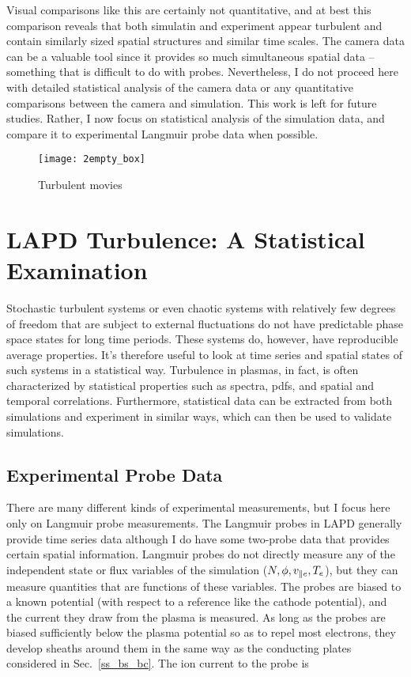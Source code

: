 Visual comparisons like this are certainly not quantitative, and at best this comparison
reveals that both simulatin and experiment appear turbulent and contain similarly sized spatial structures and similar time scales. The camera data can be a valuable tool since it provides
so much simultaneous spatial data -- something that is difficult to do with probes. Nevertheless, I do not proceed here with detailed statistical analysis of the camera data or any
quantitative comparisons between the camera and simulation. This work is left for future studies. Rather, I now focus on statistical analysis of the simulation data, and compare it to
experimental Langmuir probe data when possible.


\begin{figure}[!ht]
\centerline{\texttt{[image: 2empty\_box]}}
\caption{Turbulent movies}
\label{sim_v_exp_anim}
\end{figure}


\section{LAPD Turbulence: A Statistical Examination}
\label{s_stat_exam}

Stochastic turbulent systems or even chaotic systems with relatively few degrees of freedom that are subject to external fluctuations do not have predictable phase space states
for long time periods. These systems do, however, have reproducible average properties.
It's therefore useful to look at time series and spatial states of such systems in a statistical way. Turbulence in plasmas, in fact, is often characterized by statistical properties
such as spectra, pdfs, and spatial and temporal correlations.
Furthermore, statistical data can be extracted from both simulations and experiment in similar ways, which can then be used to validate simulations. 

\subsection{Experimental Probe Data}
\label{ss_probe_data}

There are many different kinds of experimental measurements, but I focus here only on Langmuir probe measurements. The Langmuir probes in LAPD generally provide time series data although
I do have some two-probe data that provides certain spatial information. Langmuir probes do not directly measure any of the independent state or flux variables of the simulation 
($N, \phi, v_{\parallel e}, T_e$), but they can measure quantities that are functions of these variables. The probes are biased to a known potential (with respect to a reference like the cathode potential),
and the current they draw from the plasma is measured. As long as the probes are biased sufficiently below the plasma potential so as to repel most electrons, 
they develop sheaths around them in the same way as the conducting plates considered in Sec.~\ref{ss_bs_bc}. The ion current to the probe is~\cite{hutchinson2002}

